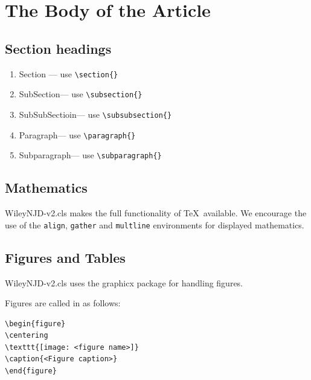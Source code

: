 \documentclass[AMA,STIX1COL]{WileyNJD-v2}
\begin{document}
\section{The Body of the Article}

\subsection{Section headings}

\begin{enumerate}[(H1)]
\item Section --- use \verb"\section{}"
\item SubSection--- use \verb"\subsection{}"
\item SubSubSectioin--- use \verb"\subsubsection{}"
\item Paragraph--- use \verb"\paragraph{}"
\item Subparagraph--- use \verb"\subparagraph{}"
\end{enumerate}

\subsection{Mathematics} \textsf{WileyNJD-v2.cls} makes the full
functionality of \AmS\/\TeX\ available. We encourage the use of
the \verb"align", \verb"gather" and \verb"multline" environments
for displayed mathematics.

\subsection{Figures and Tables}

\textsf{WileyNJD-v2.cls} uses the
\textsf{graphicx} package for handling figures.

Figures are called in as follows:
\begin{verbatim}
\begin{figure}
\centering
\texttt{[image: <figure name>]}
\caption{<Figure caption>}
\end{figure}
\end{verbatim}
\end{document}
